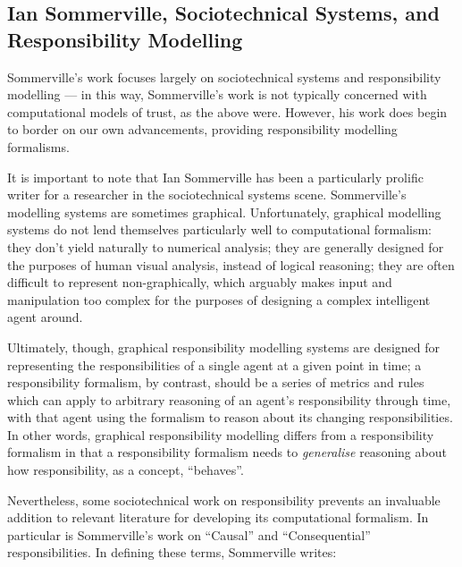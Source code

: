 
\subsection{Ian Sommerville, Sociotechnical Systems, and Responsibility Modelling}
Sommerville's work focuses largely on sociotechnical systems and responsibility modelling --- in this way, Sommerville's work is not typically concerned with computational models of trust, as the above were. However, his work does begin to border on our own advancements, providing responsibility modelling formalisms.\par

It is important to note that Ian Sommerville has been a particularly prolific writer for a researcher in the sociotechnical systems scene. Sommerville's modelling systems are sometimes graphical\cite{sommerville_graphical_responsibility}. Unfortunately, graphical modelling systems do not lend themselves particularly well to computational formalism: they don't yield naturally to numerical analysis; they are generally designed for the purposes of human visual analysis, instead of logical reasoning; they are often difficult to represent non-graphically, which arguably makes input and manipulation too complex for the purposes of designing a complex intelligent agent around.\par

Ultimately, though, graphical responsibility modelling systems are designed for representing the responsibilities of a single agent at a given point in time; a responsibility formalism, by contrast, should be a series of metrics and rules which can apply to arbitrary reasoning of an agent's responsibility through time, with that agent using the formalism to reason about its changing responsibilities. In other words, graphical responsibility modelling differs from a responsibility formalism in that a responsibility formalism needs to \emph{generalise} reasoning about how responsibility, as a concept, ``behaves''.\par

Nevertheless, some sociotechnical work on responsibility prevents an invaluable addition to relevant literature for developing its computational formalism. In particular is Sommerville's work on ``Causal'' and ``Consequential'' responsibilities. In defining these terms, Sommerville writes\cite{sommerville_dependable_systems_chap_8}:

